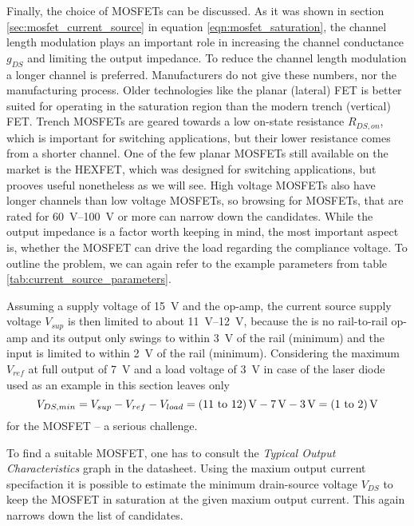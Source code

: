 Finally, the choice of MOSFETs can be discussed. As it was shown in section \ref{sec:mosfet_current_source} in equation \ref{eqn:mosfet_saturation}, the channel length modulation plays an important role in increasing the channel conductance $g_{DS}$ and limiting the output impedance. To reduce the channel length modulation a longer channel is preferred. Manufacturers do not give these numbers, nor the manufacturing process. Older technologies like the planar (lateral) FET is better suited for operating in the saturation region than the modern trench (vertical) FET. Trench MOSFETs are geared towards a low on-state resistance $R_{DS,on}$, which is important for switching applications, but their lower resistance comes from a shorter channel. One of the few planar MOSFETs still available on the market is the HEXFET, which was designed for switching applications, but prooves useful nonetheless as we will see. High voltage MOSFETs also have longer channels than low voltage MOSFETs, so browsing for MOSFETs, that are rated for \qtyrange[range-units = single]{60}{100}{\V} or more can narrow down the candidates. While the output impedance is a factor worth keeping in mind, the most important aspect is, whether the MOSFET can drive the load regarding the compliance voltage. To outline the problem, we can again refer to the example parameters from table \ref{tab:current_source_parameters}.

Assuming a supply voltage of \qty{15}{\V} and the  op-amp, the current source supply voltage $V_{sup}$ is then limited to about \qtyrange[range-units = single]{11}{12}{\V}, because the  is no rail-to-rail op-amp and its output only swings to within \qty{3}{\V} of the rail (minimum) and the input is limited to within \qty{2}{\V} of the rail (minimum). Considering the maximum $V_{ref}$ at full output of \qty{7}{\V} and a load voltage of \qty{3}{\V} in case of the  \cite{datasheet_thorlabs_780nm} laser diode used as an example in this section leaves only
\begin{equation}
    V_{DS,min} = V_{sup} - V_{ref} - V_{load} = \text{\qtyrange[range-units = bracket]{11}{12}{\V}} - \qty{7}{\V} - \qty{3}{\V} = \text{\qtyrange[range-units = bracket]{1}{2}{\V}} \label{eqn:minimum_mosfet_vds}
\end{equation}
for the MOSFET -- a serious challenge.

To find a suitable MOSFET, one has to consult the \textit{Typical Output Characteristics} graph in the datasheet. Using the maxium output current specifaction it is possible to estimate the minimum drain-source voltage $V_{DS}$ to keep the MOSFET in saturation at the given maxium output current. This again narrows down the list of candidates.

